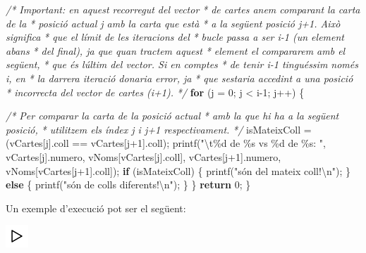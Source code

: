 \documentclass[]{book}
\newenvironment{Shaded}{\begin{snugshade}}{\end{snugshade}}
\newcommand{\CommentTok}[1]{\textcolor[rgb]{0.56,0.35,0.01}{\textit{#1}}}
\newcommand{\ControlFlowTok}[1]{\textcolor[rgb]{0.13,0.29,0.53}{\textbf{#1}}}
\newcommand{\DecValTok}[1]{\textcolor[rgb]{0.00,0.00,0.81}{#1}}
\newcommand{\NormalTok}[1]{#1}
\newcommand{\SpecialCharTok}[1]{\textcolor[rgb]{0.00,0.00,0.00}{#1}}
\newcommand{\StringTok}[1]{\textcolor[rgb]{0.31,0.60,0.02}{#1}}
\begin{document}
\begin{Shaded}
\begin{Highlighting}[]
    \CommentTok{/* Important: en aquest recorregut del vector}
\CommentTok{     * de cartes anem comparant la carta de la }
\CommentTok{     * posició actual j amb la carta que està}
\CommentTok{     * a la següent posició j+1. Això significa}
\CommentTok{     * que el límit de les iteracions del }
\CommentTok{     * bucle passa a ser i{-}1 (un element abans}
\CommentTok{     * del final), ja que quan tractem aquest}
\CommentTok{     * element el compararem amb el següent,}
\CommentTok{     * que és l\textquotesingle{}últim del vector. Si en comptes}
\CommentTok{     * de tenir i{-}1 tinguéssim només i, en }
\CommentTok{     * la darrera iteració donaria error, ja }
\CommentTok{     * que s\textquotesingle{}estaria accedint a una posició}
\CommentTok{     * incorrecta del vector de cartes (i+1).}
\CommentTok{     */}
    \ControlFlowTok{for}\NormalTok{ (j = }\DecValTok{0}\NormalTok{; j \textless{} i{-}}\DecValTok{1}\NormalTok{; j++) \{}
        
        \CommentTok{/* Per comparar la carta de la posició actual}
\CommentTok{         * amb la que hi ha a la següent posició,}
\CommentTok{         * utilitzem els índex j i j+1 respectivament.}
\CommentTok{         */}
\NormalTok{        isMateixColl = (vCartes[j].coll == vCartes[j+}\DecValTok{1}\NormalTok{].coll);}
\NormalTok{        printf(}\StringTok{"}\SpecialCharTok{\textbackslash{}t}\StringTok{\%d de \%s vs \%d de \%s: "}\NormalTok{, vCartes[j].numero, vNoms[vCartes[j].coll], vCartes[j+}\DecValTok{1}\NormalTok{].numero, vNoms[vCartes[j+}\DecValTok{1}\NormalTok{].coll]);}
        \ControlFlowTok{if}\NormalTok{ (isMateixColl) \{}
\NormalTok{            printf(}\StringTok{"són del mateix coll!}\SpecialCharTok{\textbackslash{}n}\StringTok{"}\NormalTok{);}
\NormalTok{        \} }\ControlFlowTok{else}\NormalTok{ \{}
\NormalTok{            printf(}\StringTok{"són de colls diferents!}\SpecialCharTok{\textbackslash{}n}\StringTok{"}\NormalTok{);}
\NormalTok{        \}}
\NormalTok{    \}}
    \ControlFlowTok{return} \DecValTok{0}\NormalTok{;}
\NormalTok{\}}
\end{Highlighting}
\end{Shaded}

Un exemple d'execució pot ser el següent:

\includegraphics{./img/play.png}
\end{document}
